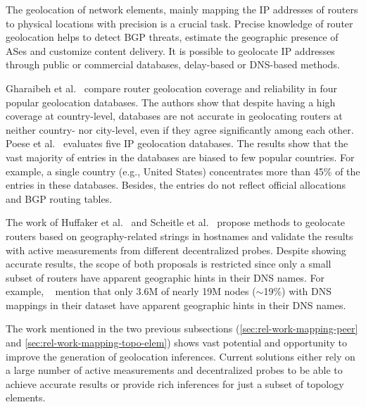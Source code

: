 	The geolocation of network elements, mainly mapping the IP addresses of routers to physical locations with precision is a crucial task. Precise knowledge of router geolocation helps to detect BGP threats, estimate the geographic presence of ASes and customize content delivery. It is possible to geolocate IP addresses through public or commercial databases, delay-based or DNS-based methods.

	Gharaibeh et al.~\cite{Gharaibeh:2017:LRG:3131365.3131380} compare router geolocation coverage and reliability in four popular geolocation databases. The authors show that despite having a  high coverage at country-level, databases are not accurate in geolocating routers at neither country- nor city-level, even if they agree significantly among each other. Poese et al.~\cite{Poese:2011:IGD:1971162.1971171} evaluates five IP geolocation databases. The results show that the vast majority of entries in the databases are biased to few popular countries. For example, a single country (e.g., United States) concentrates more than 45\% of the entries in these databases. Besides, the entries do not reflect official allocations and BGP routing tables.

	The work of Huffaker et al.~\cite{Huffaker:2014:DDR:2656877.2656879} and Scheitle et al.~\cite{8002903} propose methods to geolocate routers based on geography-related strings in hostnames and validate the results with active measurements from different decentralized probes. Despite showing accurate results, the scope of both proposals is restricted since only a small subset of routers have apparent geographic hints in their DNS names. For example, ~\cite{Huffaker:2014:DDR:2656877.2656879} mention that only 3.6M of nearly 19M nodes ($\sim$19\%) with DNS mappings in their dataset have apparent geographic hints in their DNS names. 

	The work mentioned in the two previous subsections (\ref{sec:rel-work-mapping-peer} and \ref{sec:rel-work-mapping-topo-elem}) shows vast potential and opportunity to improve the generation of geolocation inferences. Current solutions either rely on a large number of active measurements and decentralized probes to be able to achieve accurate results or provide rich inferences for just a subset of topology elements.


